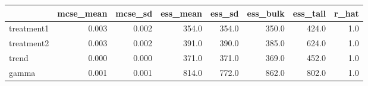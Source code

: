 \begin{tabular}{lrrrrrrr}
\toprule
{} &  mcse\_mean &  mcse\_sd &  ess\_mean &  ess\_sd &  ess\_bulk &  ess\_tail &  r\_hat \\
\midrule
treatment1 &      0.003 &    0.002 &     354.0 &   354.0 &     350.0 &     424.0 &    1.0 \\
treatment2 &      0.003 &    0.002 &     391.0 &   390.0 &     385.0 &     624.0 &    1.0 \\
trend      &      0.000 &    0.000 &     371.0 &   371.0 &     369.0 &     452.0 &    1.0 \\
gamma      &      0.001 &    0.001 &     814.0 &   772.0 &     862.0 &     802.0 &    1.0 \\
\bottomrule
\end{tabular}
